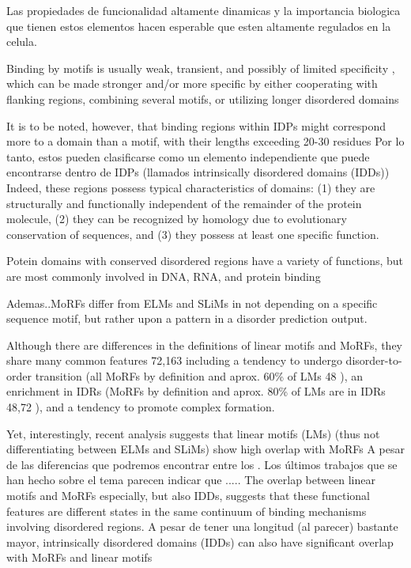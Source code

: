 Las propiedades de funcionalidad altamente dinamicas y la importancia biologica que tienen estos elementos hacen esperable que esten altamente regulados en la celula.






Binding by motifs is usually weak, transient, and possibly of limited specificity , which can be made stronger and/or more specific by either cooperating with flanking regions, combining several motifs, or utilizing longer disordered domains

It is to be noted, however, that binding regions within IDPs might correspond more to a domain than a motif, with their lengths exceeding 20-30 residues \cite{tompa2009close,chen2006conservation,chen2006conservationB}  
Por lo tanto, estos pueden clasificarse como un elemento independiente que puede encontrarse dentro de IDPs (llamados intrinsically disordered domains (IDDs))
Indeed, these regions possess typical characteristics of domains: 
(1) they are structurally and functionally independent of the remainder of the protein molecule, 
(2) they can be recognized by homology due to evolutionary conservation of sequences, and 
(3) they possess at least one specific function.

Potein domains with conserved disordered regions have a variety of functions, but are most commonly involved in DNA, RNA, and protein binding








% 
% 

Ademas..MoRFs differ from ELMs and SLiMs in not depending on a specific sequence motif, but rather upon a pattern in a disorder prediction output. 

Although there are differences in the definitions of linear
motifs and MoRFs, they share many common features 72,163
including a tendency to undergo disorder-to-order transition (all
MoRFs by definition and aprox. 60\% of LMs 48 ), an enrichment in
IDRs (MoRFs by definition and aprox. 80\% of LMs are in IDRs 48,72 ),
and a tendency to promote complex formation.


Yet, interestingly, recent analysis suggests that linear motifs (LMs) (thus not differentiating between ELMs and SLiMs) show high overlap with MoRFs \cite{fuxreiter2007local}
A pesar de las diferencias que podremos encontrar entre los . Los últimos trabajos que se han hecho sobre el tema \cite{meszaros2012disordered, fuxreiter2007local} 
parecen indicar que .....
The overlap between linear motifs and MoRFs
especially, but also IDDs, suggests that these functional features
are different states in the same continuum of binding
mechanisms involving disordered regions.
A pesar de tener una longitud (al parecer) bastante mayor, intrinsically disordered domains (IDDs) can also have significant overlap with MoRFs and linear motifs

